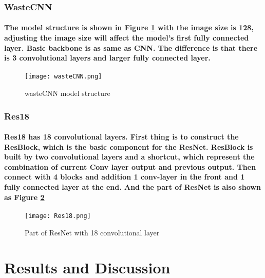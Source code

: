 \documentclass{article}
\begin{document}
        \subsubsection*{WasteCNN}
        \paragraph{The model structure is shown in Figure \ref{fig:wasteNet_model} with the image size is 128, adjusting the image size will affect the model’s first fully connected layer. Basic backbone is as same as CNN. The difference is that there is 3 convolutional layers and larger fully connected layer.}
        \begin{figure}
            \begin{centering}
            \texttt{[image: wasteCNN.png]}
            \par\end{centering}
            \caption{wasteCNN model structure}
            \label{fig:wasteNet_model}
        \end{figure}

        \subsubsection*{Res18}
        \paragraph{Res18 has 18 convolutional layers. First thing is to construct the ResBlock, which is the basic component for the ResNet. ResBlock is built by two convolutional layers and a shortcut, which represent the combination of current Conv layer output and previous output. Then connect with 4 blocks and addition 1 conv-layer in the front and 1 fully connected layer at the end. And the part of ResNet is also shown as Figure \ref{fig:res18_model}}
        \begin{figure}
            \begin{centering}
            \texttt{[image: Res18.png]}
            \par\end{centering}
            \caption{Part of ResNet with 18 convolutional layer}
            \label{fig:res18_model}
        \end{figure}


\section*{Results and Discussion}
\end{document}
